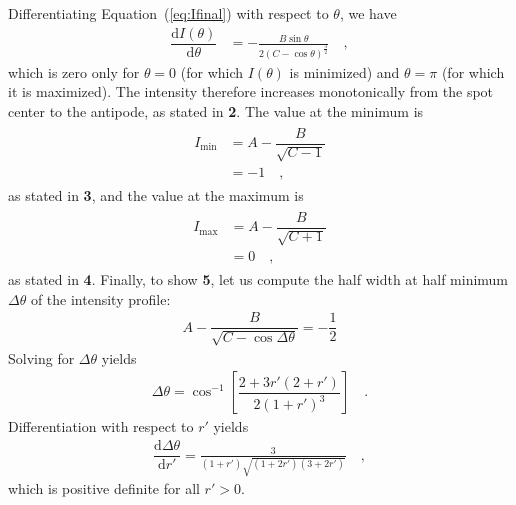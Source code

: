 \documentclass[modern]{aastex62}
\begin{document}
Differentiating Equation~(\ref{eq:Ifinal}) with respect to $\theta$, we have
%
\begin{align}
    \label{eq:Ideriv}
    \dfrac{\mathrm{d}I(\theta)}{\mathrm{d}\theta} & =
    -\frac{B\sin\theta}{2(C - \cos\theta)^\frac{3}{2}}
    \quad,
\end{align}
%
which is zero only for $\theta = 0$ (for which $I(\theta)$ is
minimized) and $\theta = \pi$ (for which it is maximized). The intensity
therefore increases monotonically from the spot center to the antipode,
as stated in \textbf{2}. The value at the minimum is
%
\begin{align}
    \begin{split}
        I_{\mathrm{min}} & = A - \dfrac{B}{\sqrt{C - 1}} \\
        & = -1
        \quad,
    \end{split}
\end{align}
%
as stated in \textbf{3}, and the value at the maximum is
%
\begin{align}
    \begin{split}
        I_{\mathrm{max}} & = A - \dfrac{B}{\sqrt{C + 1}} \\
        & = 0
        \quad,
    \end{split}
\end{align}
%
as stated in \textbf{4}.
Finally, to show \textbf{5}, let us compute the half width at half minimum
$\Delta\theta$ of the intensity profile:
%
\begin{align}
    A - \dfrac{B}{\sqrt{C - \cos{\Delta\theta}}} =
    -\dfrac{1}{2}
\end{align}
%
Solving for $\Delta\theta$ yields
%
\begin{align}
    \label{eq:hwhm}
    \Delta\theta =
    \cos^{-1} \left[ \dfrac{2 + 3 r' (2 + r')}{2 (1 + r')^3} \right]
    \quad.
\end{align}
%
Differentiation with respect to $r'$ yields
%
\begin{align}
    \dfrac{\mathrm{d}\Delta\theta}{\mathrm{d}r'} =
    \frac{3}{\left(1 + r'\right)
        \sqrt{\left(1 + 2 r'\right)
            \left(3 + 2 r'\right)}}
    \quad,
\end{align}
%
which is positive definite for all $r' > 0$.
\end{document}
